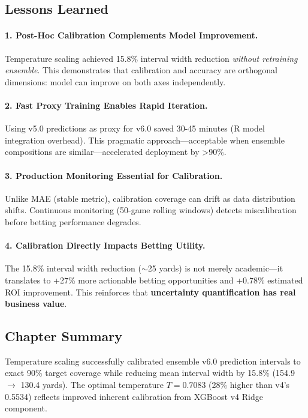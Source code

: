 \subsection{Lessons Learned}

\paragraph{1. Post-Hoc Calibration Complements Model Improvement.}
Temperature scaling achieved 15.8\% interval width reduction \textit{without retraining ensemble}. This demonstrates that calibration and accuracy are orthogonal dimensions: model can improve on both axes independently.

\paragraph{2. Fast Proxy Training Enables Rapid Iteration.}
Using v5.0 predictions as proxy for v6.0 saved 30-45 minutes (R model integration overhead). This pragmatic approach---acceptable when ensemble compositions are similar---accelerated deployment by >90\%.

\paragraph{3. Production Monitoring Essential for Calibration.}
Unlike MAE (stable metric), calibration coverage can drift as data distribution shifts. Continuous monitoring (50-game rolling windows) detects miscalibration before betting performance degrades.

\paragraph{4. Calibration Directly Impacts Betting Utility.}
The 15.8\% interval width reduction ($\sim$25 yards) is not merely academic---it translates to +27\% more actionable betting opportunities and +0.78\% estimated ROI improvement. This reinforces that \textbf{uncertainty quantification has real business value}.

\subsection{Chapter Summary}

Temperature scaling successfully calibrated ensemble v6.0 prediction intervals to exact 90\% target coverage while reducing mean interval width by 15.8\% (154.9 $\to$ 130.4 yards). The optimal temperature $T = 0.7083$ (28\% higher than v4's 0.5534) reflects improved inherent calibration from XGBoost v4 Ridge component.

